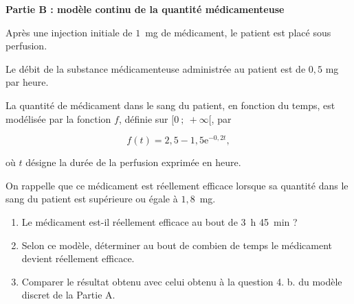 \documentclass[10pt]{article}
\begin{document}
\bigskip

\textbf{Partie B : modèle continu de la quantité médicamenteuse}

\medskip

Après une injection initiale de $1$~mg de médicament, le patient est placé sous perfusion.

Le débit de la substance médicamenteuse administrée au patient est de $0,5$ mg par heure.

La quantité de médicament dans le sang du patient, en fonction du temps, est modélisée
par la fonction $f$, définie sur $[0~;~ +\infty[$, par 

\[f(t) = 2,5 - 1,5\text{e}^{-0,2t},\]

où $t$ désigne la durée de la perfusion exprimée en heure.

On rappelle que ce médicament est réellement efficace lorsque sa quantité dans le sang du patient est supérieure ou égale à $1,8$~mg.

\medskip

\begin{enumerate}
\item Le médicament est-il réellement efficace au bout de 3~h 45~min ?
\item Selon ce modèle, déterminer au bout de combien de temps le médicament devient réellement efficace.
\item Comparer le résultat obtenu avec celui obtenu à la question 4. b. du modèle discret de la Partie A.
\end{enumerate}

\bigskip
\end{document}
